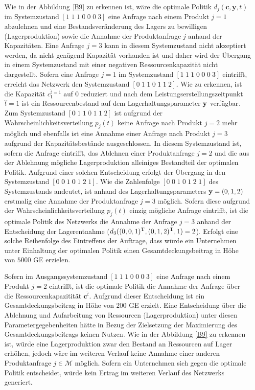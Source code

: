 Wie in der Abbildung \ref{B9} zu erkennen ist, wäre die optimale Politik $d_{j}({\textbf{c},\textbf{y}, t})$ im Systemzustand $[1\;1\;1\;0\;0\;0\;3]$ eine Anfrage nach einem Produkt $j=1$ abzulehnen und eine Bestandsveränderung des Lagers zu bewilligen (Lagerproduktion) sowie die Annahme der Produktanfrage $j$ anhand der Kapazitäten. Eine Anfrage $j=3$ kann in diesem Systemzustand nicht akzeptiert werden, da nicht genügend Kapazität vorhanden ist und daher wird der Übergang in einem Systemzustand mit einer negativen Ressourcenkapazität nicht dargestellt. Sofern eine Anfrage $j=1$ im Systemzustand $[1\;1\;1\;0\;0\;0\;3]$ eintrifft, erreicht das Netzwerk den Systemzustand $[0\;1\;1\;0\;1\;1\;2]$. Wie zu erkennen, ist die Kapazität $c_1^{\hat t=1}$ auf $0$ reduziert und nach dem Leistungserstellungszeitpunkt $\hat t = 1$ ist ein Ressourcenbestand auf dem Lagerhaltungsparameter $\textbf y$ verfügbar. Zum Systemzustand $[0\;1\;1\;0\;1\;1\;2]$ ist aufgrund der Wahrscheinlichkeitsverteilung $p_j(t)$ keine Anfrage nach Produkt $j=2$ mehr möglich und ebenfalls ist eine Annahme einer Anfrage nach Produkt $j=3$ aufgrund der Kapazitätsbestände ausgeschlossen. In diesem Systemzustand ist, sofern die Anfrage eintrifft, das Ablehnen einer Produktanfrage $j=2$ und die aus der Ablehnung mögliche Lagerproduktion alleiniges Bestandteil der optimalen Politik. Aufgrund einer solchen Entscheidung erfolgt der Übergang in den Systemzustand $[0\;0\;1\;0\;1\;2\;1]$. Wie die Zahlenfolge $[0\;0\;1\;0\;1\;2\;1]$ des Systemzustands andeutet, ist anhand des Lagerhaltungsparameters $\textbf y=(0,1,2)$ erstmalig eine Annahme der Produktanfrage $j=3$ möglich. Sofern diese aufgrund der Wahrscheinlichkeitsverteilung $p_j(t)$ einzig mögliche Anfrage eintrifft, ist die optimale Politik des Netzwerks die Annahme der Anfrage $j=3$ anhand der Entscheidung der Lagerentnahme ($d_{3}((0,0,1)^{\textnormal T},(0,1,2)^{\textnormal T}, 1)=2$). Erfolgt eine solche Reihenfolge des Eintreffens der Auftrage, dass würde ein Unternehmen unter Einhaltung der optimalen Politik einen Gesamtdeckungsbeitrag in Höhe von $5000$ GE erzielen.

Sofern im Ausgangssystemzustand $[1\;1\;1\;0\;0\;0\;3]$ eine Anfrage nach einem Produkt $j=2$ eintrifft, ist die optimale Politik die Annahme der Anfrage über die Ressourcenkapazitität $\textbf{c}^{\hat t}$. Aufgrund dieser Entscheidung ist ein Gesamtdeckungsbeitrag in Höhe von $200$ GE erzielt. Eine Entscheidung über die Ablehnung und Aufarbeitung von Ressourcen (Lagerproduktion) unter diesen Parametergegebenheiten hätte in Bezug der Zielsetzung der Maximierung des Gesamtdeckungsbeitrags keinen Nutzen. Wie in der Abbildung \ref{B9} zu erkennen ist, würde eine Lagerproduktion zwar den Bestand an Ressourcen auf Lager erhöhen, jedoch wäre im weiteren Verlauf keine Annahme einer anderen Produktanfrage $j\in\mathcal M$ möglich. Sofern ein Unternehmen sich gegen die optimale Politik entscheidet, würde kein Ertrag im weiteren Verlauf des Netzwerks generiert.


